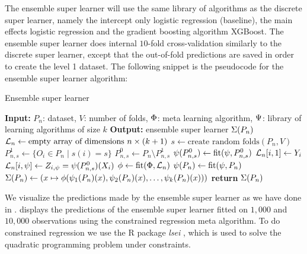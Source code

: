 \documentclass[./main.tex]{subfiles}
\begin{document}
The ensemble super learner will use the same library of algorithms as the discrete super learner, namely the intercept only logistic regression (baseline), the main effects logistic regression and the gradient boosting algorithm XGBoost. The ensemble super learner does internal $ 10 $-fold cross-validation similarly to the discrete super learner, except that the out-of-fold predictions are saved in order to create the level 1 dataset. The following snippet is the pseudocode for the ensemble super learner algorithm:
\begin{algorithm}[H]
\caption{Ensemble super learner}
\begin{algorithmic}[1]
\State \textbf{Input:} $P_n$: dataset, $V$: number of folds, $ \Phi $: meta learning algorithm, $ \Psi $: library of learning algorithms of size $ k $
\State \textbf{Output:} ensemble super learner $ \Sigma(P_n) $
\State $\mathcal{L}_n \gets \text{empty array of dimensions } n \times (k+1)$  
\State $s \gets \text{create random folds}(P_n, V)$ 
    \State $P_{n, s}^{1} \gets \{O_i \in P_n \mid s(i) = s\} $
    \State $P_{n, s}^{0} \gets P_n \setminus P_{n,s}^{1} $
    \For{$\la \in \lib$}
        \State $ \psi(P_{n,s}^{0}) \gets \text{fit}(\psi, P_{n, s}^{0})$
            \State $ \mathcal{L}_n[i, 1] \gets Y_i $ 
            \State $ \mathcal{L}_n[i, \psi] \gets Z_{i, \psi} = \psi(P_{n,s}^{0})(X_i) $ 
        \EndFor
    \EndFor
\EndFor
\State $ \phi \gets \text{fit}(\Phi, \mathcal{L}_n) $ 
\For{$\la \in \lib$}
    \State $ \psi(P_{n}) \gets \text{fit}(\psi, P_{n})$ 
\EndFor
\State $ \Sigma(P_n) \gets (x \mapsto \phi(\psi_1(P_n)(x), \psi_2(P_n)(x), \dots , \psi_{k}(P_n)(x))) $ 
\State \textbf{return} $ \Sigma(P_n) $
\end{algorithmic}
\end{algorithm}
We visualize the predictions made by the ensemble super learner as we have done in .  displays the predictions of the ensemble super learner fitted on $ 1,000 $ and $ 10,000 $ observations using the constrained regression meta algorithm. To do constrained regression we use the R package \textit{lsei} \parencite{lsei}, which is used to solve the quadratic programming problem under constraints.  
\end{document}
